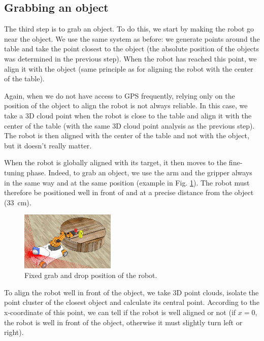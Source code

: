 \documentclass[a4paper, 10pt, conference]{ieeeconf}
\begin{document}
    \subsection{Grabbing an object}
    
    The third step is to grab an object. To do this, we start by making the robot go near the object. We use the same system as before: we generate points around the table and take the point closest to the object (the absolute position of the objects was determined in the previous step). When the robot has reached this point, we align it with the object (same principle as for aligning the robot with the center of the table).
    
    Again, when we do not have access to GPS frequently, relying only on the position of the object to align the robot is not always reliable. In this case, we take a 3D cloud point when the robot is close to the table and align it with the center of the table (with the same 3D cloud point analysis as the previous step). The robot is then aligned with the center of the table and not with the object, but it doesn't really matter.
    
    When the robot is globally aligned with its target, it then moves to the fine-tuning phase. Indeed, to grab an object, we use the arm and the gripper always in the same way and at the same position (example in Fig. \ref{fig:manipulation.grasp.drop.position}). The robot must therefore be positioned well in front of and at a precise distance from the object (\SI{33}{\centi\meter}).
    
    \begin{figure}[!h]
        \centering
        \includegraphics[width=0.4\textwidth]{resources/png/grasp-drop-position.png}
        \caption{Fixed grab and drop position of the robot.}
        \label{fig:manipulation.grasp.drop.position}
    \end{figure}
    
    To align the robot well in front of the object, we take 3D point clouds, isolate the point cluster of the closest object and calculate its central point. According to the x-coordinate of this point, we can tell if the robot is well aligned or not (if $x = 0$, the robot is well in front of the object, otherwise it must slightly turn left or right).
    
\end{document}
